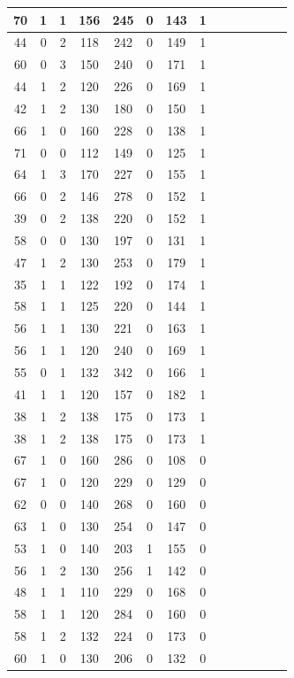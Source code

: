 \documentclass{article}
\begin{document}
\begin{center}
\begin{longtable}{|c|c|c|c|c|c|c|c|c|c|c|c|c|c|}
\hline
70 & 1 & 1 & 156 & 245 & 0 & 143 & 1 \\
\hline
44 & 0 & 2 & 118 & 242 & 0 & 149 & 1 \\
\hline
60 & 0 & 3 & 150 & 240 & 0 & 171 & 1 \\
\hline
44 & 1 & 2 & 120 & 226 & 0 & 169 & 1 \\
\hline
42 & 1 & 2 & 130 & 180 & 0 & 150 & 1 \\
\hline
66 & 1 & 0 & 160 & 228 & 0 & 138 & 1 \\
\hline
71 & 0 & 0 & 112 & 149 & 0 & 125 & 1 \\
\hline
64 & 1 & 3 & 170 & 227 & 0 & 155 & 1 \\
\hline
66 & 0 & 2 & 146 & 278 & 0 & 152 & 1 \\
\hline
39 & 0 & 2 & 138 & 220 & 0 & 152 & 1 \\
\hline
58 & 0 & 0 & 130 & 197 & 0 & 131 & 1 \\
\hline
47 & 1 & 2 & 130 & 253 & 0 & 179 & 1 \\
\hline
35 & 1 & 1 & 122 & 192 & 0 & 174 & 1 \\
\hline
58 & 1 & 1 & 125 & 220 & 0 & 144 & 1 \\
\hline
56 & 1 & 1 & 130 & 221 & 0 & 163 & 1 \\
\hline
56 & 1 & 1 & 120 & 240 & 0 & 169 & 1 \\
\hline
55 & 0 & 1 & 132 & 342 & 0 & 166 & 1 \\
\hline
41 & 1 & 1 & 120 & 157 & 0 & 182 & 1 \\
\hline
38 & 1 & 2 & 138 & 175 & 0 & 173 & 1 \\
\hline
38 & 1 & 2 & 138 & 175 & 0 & 173 & 1 \\
\hline
67 & 1 & 0 & 160 & 286 & 0 & 108 & 0 \\
\hline
67 & 1 & 0 & 120 & 229 & 0 & 129 & 0 \\
\hline
62 & 0 & 0 & 140 & 268 & 0 & 160 & 0 \\
\hline
63 & 1 & 0 & 130 & 254 & 0 & 147 & 0 \\
\hline
53 & 1 & 0 & 140 & 203 & 1 & 155 & 0 \\
\hline
56 & 1 & 2 & 130 & 256 & 1 & 142 & 0 \\
\hline
48 & 1 & 1 & 110 & 229 & 0 & 168 & 0 \\
\hline
58 & 1 & 1 & 120 & 284 & 0 & 160 & 0 \\
\hline
58 & 1 & 2 & 132 & 224 & 0 & 173 & 0 \\
\hline
60 & 1 & 0 & 130 & 206 & 0 & 132 & 0 \\

\end{longtable}
\end{center}
\end{document}
